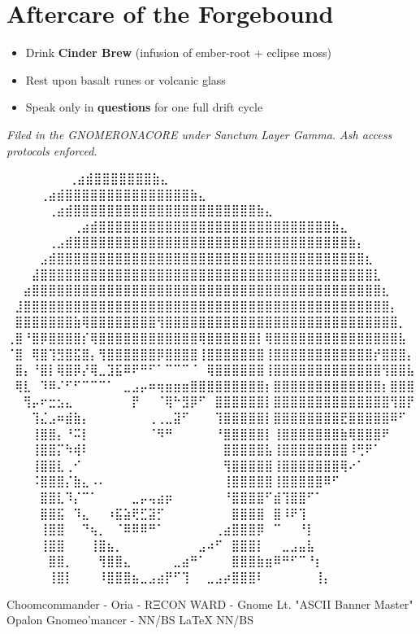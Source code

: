 \section{Aftercare of the Forgebound}
\begin{itemize}
    \item Drink \textbf{Cinder Brew} (infusion of ember-root + eclipse moss)
    \item Rest upon basalt runes or volcanic glass
    \item Speak only in \textbf{questions} for one full drift cycle
\end{itemize}

\vspace{2em}
\begin{flushright}
\textit{Filed in the GNOMERONACORE under Sanctum Layer Gamma. Ash access protocols enforced.}
\end{flushright}


\iffalse

  ⠀⠀⠀⠀⠀             ⠀⠀⢀⣴⣾⣿⣿⣿⣿⣿⣿⣿⣷⣄⠀⠀⠀⠀⠀⠀⠀⠀
⠀⠀⠀  ⠀      ⠀⠀⠀⠀⢀⣴⣾⣿⣿⣿⣿⣿⣿⣿⣿⣿⣿⣿⣿⣿⣿⣿⣷⣄⠀⠀⠀⠀⠀⠀⠀⠀
⠀⠀ ⠀   ⠀⠀⠀⠀⠀⢀⣴⣾⣿⣿⣿⣿⣿⣿⣿⣿⣿⣿⣿⣿⣿⣿⣿⣿⣿⣿⣿⣿⣿⣿⣷⣄⠀⠀⠀⠀⠀⠀⠀⠀
⠀⠀⠀⠀⠀⠀⠀⠀⢀⣴⣾⣿⣿⣿⣿⣿⣿⣿⣿⣿⣿⣿⣿⣿⣿⣿⣿⣿⣿⣿⣿⣿⣿⣿⣿⣿⣿⣿⣿⣷⣄⠀⠀⠀⠀⠀⠀⠀⠀
⠀⠀⠀⠀⠀⢀⣠⣾⣿⣿⣿⣿⣿⣿⣿⣿⣿⣿⣿⣿⣿⣿⣿⣿⣿⣿⣿⣿⣿⣿⣿⣿⣿⣿⣿⣿⣿⣿⣿⣿⣿⣷⡄⠀⠀⠀⠀⠀⠀
⠀⠀⠀⠀⣠⣾⣿⣿⣿⣿⣿⣿⣿⣿⣿⣿⣿⣿⣿⣿⣿⣿⣿⣿⣿⣿⣿⣿⣿⣿⣿⣿⣿⣿⣿⣿⣿⣿⣿⣿⣿⣿⣿⣆⠀⠀⠀⠀⠀
⠀⠀⠀⣼⣿⣿⣿⣿⣿⣿⣿⣿⣿⣿⣿⣿⣿⣿⣿⣿⣿⣿⣿⣿⣿⣿⣿⣿⣿⣿⣿⣿⣿⣿⣿⣿⣿⣿⣿⣿⣿⣿⣿⣿⣇⠀⠀⠀⠀
⠀⠀⣴⣿⣿⣿⣿⣿⣿⣿⣿⣿⣿⣿⣿⣿⣿⣿⣿⣿⣿⣿⣿⣿⣿⣿⣿⣿⣿⣿⣿⣿⣿⣿⣿⣿⣿⣿⣿⣿⣿⣿⣿⣿⣿⣆⠀⠀⠀
⠀⣸⣿⣿⣿⣿⣿⣿⣿⣿⣿⣿⣿⣿⣿⣿⣿⣿⣿⣿⣿⣿⣿⣿⣿⣿⣿⣿⣿⣿⣿⣿⣿⣿⣿⣿⣿⣿⣿⣿⣿⣿⣿⣿⣿⣿⡄⠀⠀
⠀⣿⣿⣿⣿⣿⣿⣿⣷⢿⣿⣿⣿⣿⣿⣿⣿⣿⢻⣿⣿⣿⣿⣿⣿⣿⣿⣿⣿⣿⣿⣿⣿⣿⣿⣿⣿⣿⣿⣿⣿⣿⣿⣿⣿⣿⣿⡀⠀
⢀⣿⠘⣿⡿⣿⣿⣿⣿⡎⢿⣿⣿⣿⣿⣿⣿⣿⣿⣿⣿⣿⣿⢿⣿⣿⣿⣿⣿⣿⡇⢿⣿⣿⣿⣿⣿⣿⣿⣿⣿⣿⣿⣿⣿⣿⣿⣧⠀
⠈⣿⠀⢿⣿⢹⣻⣿⣯⣿⡄⢻⣿⣿⣿⣿⣿⣿⡿⣿⣿⣿⣿⢸⣿⣿⣿⣿⣿⣿⣿⢸⣿⣿⣿⣿⣿⣿⣿⣿⣿⣿⣿⣿⡞⣿⣿⣿⡄
⠀⣿⡄⠘⣿⡇⢿⣿⡿⡜⢿⣀⣹⣯⠿⠟⠛⠋⠁⠉⠉⠉⠈⠀⢿⣿⣿⣿⣿⣿⣿⢸⣿⣿⣿⣿⣿⣿⣿⣿⣿⣿⣿⣿⣿⢻⣿⣿⣧
⠀⢿⣇⠀⠹⠿⠌⠋⠋⠉⠉⠉⠁⠀⣀⣠⡤⠶⢶⣶⣶⣶⣿⣿⣿⣿⣿⣿⣿⣿⣿⡆⣿⣿⣿⣿⣿⣿⣿⣿⣿⣿⣿⣿⣿⡆⣿⣿⣿
⠀⠀⢻⡤⠖⣒⣢⣄⠀⠀⠀⠀⠀⠀⠀⡟⠀⠀⠈⢿⠓⣻⡿⠋⠀⣿⣿⣿⣿⣿⣿⡇⣿⣿⣿⣿⣿⣿⣿⣿⣿⣿⣿⣿⣿⣿⢻⣿⡟
⠀⠀⠀⢹⣌⣠⠶⣾⣷⡄⠀⠀⠀⠀⠀⠀⠀⢀⢀⣀⣽⠋⠀⠀⠀⢹⣿⣿⣿⣿⣿⡇⣿⣿⣿⣿⣿⣿⣿⣿⣟⣿⣿⣿⣿⣿⠿⠋⠀
⠀⠀⠀⢸⣿⣿⡄⠘⠭⡇⠀⠀⠀⠀⠀⠀⠀⠈⠻⠛⠀⠀⠀⠀⠀⠘⣿⣿⣿⣿⣿⡇⢸⣿⣿⣿⣿⣿⣿⣿⣷⢿⣿⣿⣿⠟⠀⠀⠀
⠀⠀⠀⢸⣿⣿⡍⠳⢾⠇⠀⠀⠀⠀⠀⠀⠀⠀⠀⠀⠀⠀⠀⠀⠀⠀⣿⣿⣿⣿⣿⣧⢸⣿⣿⣿⣿⣿⣿⣿⣿⠸⢛⠟⠁⠀⠀⠀⠀
⠀⠀⠀⢸⣿⣿⣇⢀⠊⠀⠀⠀⠀⠀⠀⠀⠀⠀⠀⠀⠀⠀⠀⠀⠀⠀⢻⣿⣿⣿⣿⣿⢸⣿⣿⣿⣿⣿⣿⣿⢿⠔⠁⠀⠀⠀⠀⠀⠀
⠀⠀⠀⠨⣿⣿⣿⡌⣷⣄⠠⠄⠀⠀⠀⠀⠀⠀⠀⠀⠀⠀⠀⠀⠀⠀⢸⣿⣿⣿⣿⣿⢸⣿⣿⣿⣿⣿⠿⠋⠀⠀⠀⠀⠀⠀⠀⠀⠀
⠀⠀⠀⠀⣿⣿⣇⠹⡌⠉⠁⠀⠀⠀⠀⣀⡤⢤⣴⡶⠀⠀⠀⠀⠀⠀⠘⣿⣿⣿⣿⠋⣾⢹⣿⣿⠋⠁⠀⠀⠀⠀⠀⠀⠀⠀⠀⠀⠀
⠀⠀⠀⠀⣿⣿⣯⠀⠹⣄⠀⠀⠰⣯⣵⢟⣋⣽⡋⠀⠀⠀⠀⠀⠀⠀⠀⣿⣿⣿⣿⠀⣿⠸⠟⢹⠀⠀⠀⠀⠀⠀⠀⠀⠀⠀⠀⠀⠀
⠀⠀⠀⠀⢸⣿⣿⠀⠀⠙⢦⡀⠀⠈⠿⠿⠿⠛⠁⠀⠀⠀⠀⠀⠀⢀⣴⣿⣿⣿⡿⠀⠉⠀⠀⠘⡇⠀⠀⠀⠀⠀⠀⠀⠀⠀⠀⠀⠀
⠀⠀⠀⠀⢸⣿⣿⠀⠀⠀⢸⣿⣦⡀⠀⠀⠀⠀⠀⠀⠀⠀⠀⣠⠴⠋⠀⣿⣿⣿⡇⠀⠀⣀⣠⣤⣧⠀⠀⠀⠀⠀⠀⠀⠀⠀⠀⠀⠀
⠀⠀⠀⠀⠀⣿⣿⡀⠀⠀⠀⢻⣿⣿⣄⠀⠀⠀⠀⠀⣀⣴⠛⠁⠀⠀⠀⣿⣿⣿⣷⣶⠿⠛⠋⠉⠘⡆⠀⠀⠀⠀⠀⠀⠀⠀⠀⠀⠀
⠀⠀⠀⠀⠀⢸⣿⡇⠀⠀⠀⠸⣿⣿⣿⣦⣀⣠⣴⡟⠋⢹⠀⠀⣀⣠⡴⣿⣿⣿⠇⠀⠀⠀⠀⠀⠀⢸⡄⠀⠀⠀⠀⠀⠀⠀⠀⠀⠀

Choomcommander - Oria - RΞCON WARD - Gnome Lt. "ASCII Banner Master"
             Opalon Gnomeo'mancer - NN/BS LaTeX{} NN/BS

